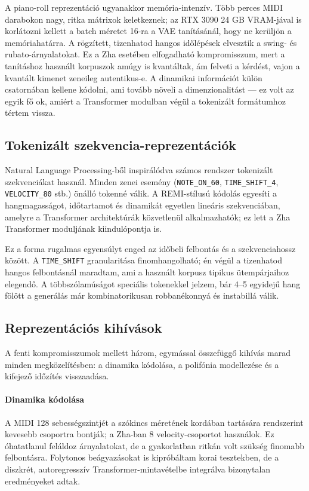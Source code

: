 A piano-roll reprezentáció ugyanakkor memória-intenzív. Több perces MIDI darabokon nagy, ritka mátrixok keletkeznek; az RTX 3090 24 GB VRAM-jával is korlátozni kellett a batch méretet 16-ra a VAE tanításánál, hogy ne kerüljön a memóriahatárra. A rögzített, tizenhatod hangos időlépések elvesztik a swing- és rubato-árnyalatokat. Ez a Zha esetében elfogadható kompromisszum, mert a tanításhoz használt korpuszok amúgy is kvantáltak, ám felveti a kérdést, vajon a kvantált kimenet zeneileg autentikus-e. A dinamikai információt külön csatornában kellene kódolni, ami tovább növeli a dimenzionalitást --- ez volt az egyik fő ok, amiért a Transformer modulban végül a tokenizált formátumhoz tértem vissza.

\subsection{Tokenizált szekvencia-reprezentációk}

Natural Language Processing-ből inspirálódva számos rendszer tokenizált szekvenciákat használ. Minden zenei esemény (\texttt{NOTE\_ON\_60}, \texttt{TIME\_SHIFT\_4}, \texttt{VELOCITY\_80} stb.) önálló tokenné válik. A REMI-stílusú kódolás \cite{huang2020pop} egyesíti a hangmagasságot, időtartamot és dinamikát egyetlen lineáris szekvenciában, amelyre a Transformer architektúrák közvetlenül alkalmazhatók; ez lett a Zha Transformer moduljának kiindulópontja is.

Ez a forma rugalmas egyensúlyt enged az időbeli felbontás és a szekvenciahossz között. A \texttt{TIME\_SHIFT} granularitása finomhangolható; én végül a tizenhatod hangos felbontásnál maradtam, ami a használt korpusz tipikus ütempárjaihoz elegendő. A többszólamúságot speciális tokenekkel jelzem, bár 4--5 egyidejű hang fölött a generálás már kombinatorikusan robbanékonnyá és instabillá válik.

\subsection{Reprezentációs kihívások}

A fenti kompromisszumok mellett három, egymással összefüggő kihívás marad minden megközelítésben: a dinamika kódolása, a polifónia modellezése és a kifejező időzítés visszaadása.

\paragraph{Dinamika kódolása} A MIDI 128 sebességszintjét a szókincs méretének kordában tartására rendszerint kevesebb csoportra bontják; a Zha-ban 8 velocity-csoportot használok. Ez óhatatlanul feláldoz árnyalatokat, de a gyakorlatban ritkán volt szükség finomabb felbontásra. Folytonos beágyazásokat is kipróbáltam korai tesztekben, de a diszkrét, autoregresszív Transformer-mintavételbe integrálva bizonytalan eredményeket adtak.


